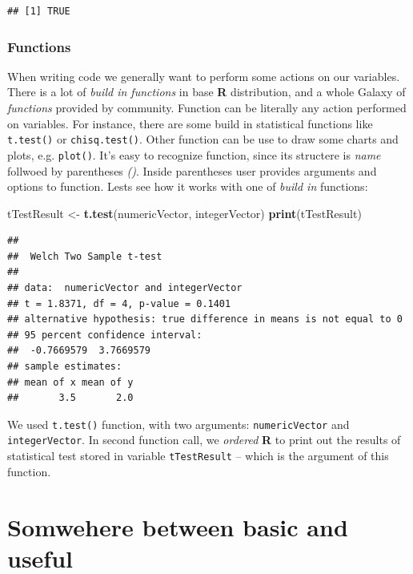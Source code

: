 \documentclass[]{book}
\newenvironment{Shaded}{\begin{snugshade}}{\end{snugshade}}
\newcommand{\KeywordTok}[1]{\textcolor[rgb]{0.12,0.11,0.11}{\textbf{#1}}}
\newcommand{\StringTok}[1]{\textcolor[rgb]{0.75,0.01,0.01}{#1}}
\newcommand{\NormalTok}[1]{\textcolor[rgb]{0.12,0.11,0.11}{#1}}
\theoremstyle{definition}
\theoremstyle{definition}
\theoremstyle{definition}
\theoremstyle{remark}
\begin{document}
\begin{verbatim}
## [1] TRUE
\end{verbatim}

\subsection{Functions}\label{functions}

When writing code we generally want to perform some actions on our
variables. There is a lot of \emph{build in functions} in base
\textbf{R} distribution, and a whole Galaxy of \emph{functions} provided
by community. Function can be literally any action performed on
variables. For instance, there are some build in statistical functions
like \texttt{t.test()} or \texttt{chisq.test()}. Other function can be
use to draw some charts and plots, e.g. \texttt{plot()}. It's easy to
recognize function, since its structere is \emph{name} follwoed by
parentheses \emph{()}. Inside parentheses user provides arguments and
options to function. Lests see how it works with one of \emph{build in}
functions:

\begin{Shaded}
\begin{Highlighting}[]
\NormalTok{tTestResult <-}\StringTok{ }\KeywordTok{t.test}\NormalTok{(numericVector, integerVector)}
\KeywordTok{print}\NormalTok{(tTestResult)}
\end{Highlighting}
\end{Shaded}

\begin{verbatim}
## 
##  Welch Two Sample t-test
## 
## data:  numericVector and integerVector
## t = 1.8371, df = 4, p-value = 0.1401
## alternative hypothesis: true difference in means is not equal to 0
## 95 percent confidence interval:
##  -0.7669579  3.7669579
## sample estimates:
## mean of x mean of y 
##       3.5       2.0
\end{verbatim}

We used \texttt{t.test()} function, with two arguments:
\texttt{numericVector} and \texttt{integerVector}. In second function
call, we \emph{ordered} \textbf{R} to print out the results of
statistical test stored in variable \texttt{tTestResult} -- which is the
argument of this function.

\chapter{Somwehere between basic and
useful}\label{somwehere-between-basic-and-useful}
\end{document}
